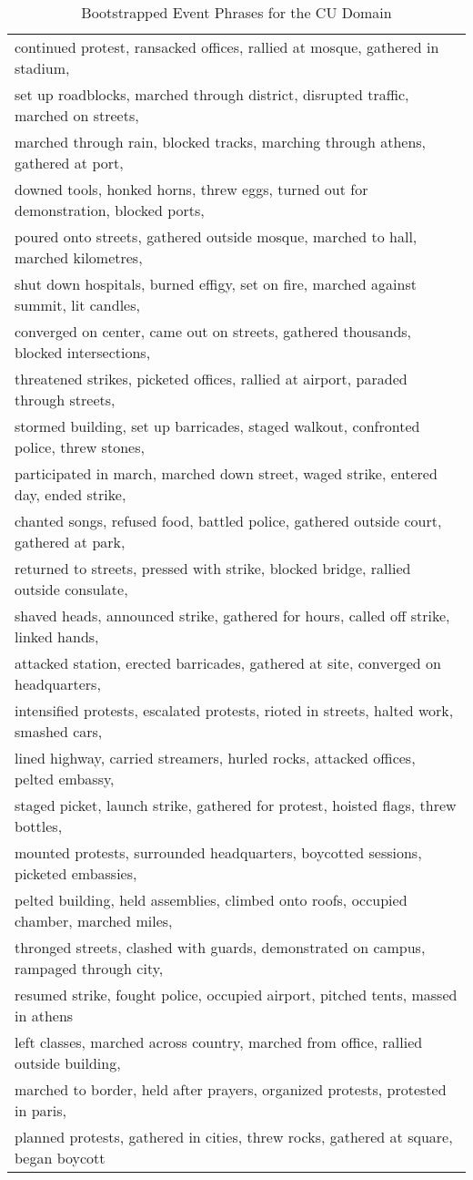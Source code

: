 \begin{table}[htbp]
\begin{tabular}[center]{|l|}
continued protest, ransacked offices, rallied at mosque, gathered in stadium, \\
set up roadblocks, marched through district, disrupted traffic, marched on streets, \\
marched through rain, blocked tracks, marching through athens, gathered at port, \\
downed tools, honked horns, threw eggs, turned out for demonstration, blocked ports, \\
poured onto streets, gathered outside mosque, marched to hall, marched kilometres, \\
shut down hospitals, burned effigy, set on fire, marched against summit, lit candles, \\
converged on center, came out on streets, gathered thousands, blocked intersections, \\
threatened strikes, picketed offices, rallied at airport, paraded through streets, \\
stormed building, set up barricades, staged walkout, confronted police, threw stones, \\
participated in march, marched down street, waged strike, entered day, ended strike, \\
chanted songs, refused food, battled police, gathered outside court, gathered at park, \\
returned to streets, pressed with strike, blocked bridge, rallied outside consulate, \\
shaved heads, announced strike, gathered for hours, called off strike, linked hands, \\
attacked station, erected barricades, gathered at site, converged on headquarters, \\
intensified protests, escalated protests, rioted in streets, halted work, smashed cars, \\
lined highway, carried streamers, hurled rocks, attacked offices, pelted embassy, \\
staged picket, launch strike, gathered for protest, hoisted flags, threw bottles, \\
mounted protests, surrounded headquarters, boycotted sessions, picketed embassies, \\
pelted building, held assemblies, climbed onto roofs, occupied chamber, marched miles, \\
thronged streets, clashed with guards, demonstrated on campus, rampaged through city, \\
resumed strike, fought police, occupied airport, pitched tents, massed in athens\\
left classes, marched across country, marched from office, rallied outside building, \\
marched to border, held after prayers, organized protests, protested in paris, \\
planned protests, gathered in cities, threw rocks, gathered at square, began boycott\\

\hline
\end{tabular}
\caption{Bootstrapped Event Phrases for the CU Domain}
\label{event-phrase-table}
\end{table}




